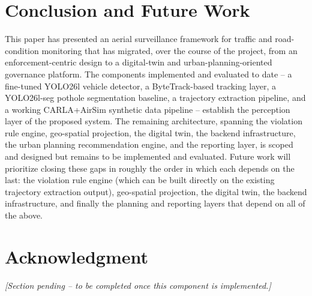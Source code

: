 \documentclass[conference]{IEEEtran}
\newcommand{\pending}{\textit{[Section pending -- to be completed once this component is implemented.]}}
\begin{document}
\section{Conclusion and Future Work}

This paper has presented an aerial surveillance framework for traffic and road-condition monitoring that has migrated, over the course of the project, from an enforcement-centric design to a digital-twin and urban-planning-oriented governance platform. The components implemented and evaluated to date -- a fine-tuned YOLO26l vehicle detector, a ByteTrack-based tracking layer, a YOLO26l-seg pothole segmentation baseline, a trajectory extraction pipeline, and a working CARLA+AirSim synthetic data pipeline -- establish the perception layer of the proposed system. The remaining architecture, spanning the violation rule engine, geo-spatial projection, the digital twin, the backend infrastructure, the urban planning recommendation engine, and the reporting layer, is scoped and designed but remains to be implemented and evaluated. Future work will prioritize closing these gaps in roughly the order in which each depends on the last: the violation rule engine (which can be built directly on the existing trajectory extraction output), geo-spatial projection, the digital twin, the backend infrastructure, and finally the planning and reporting layers that depend on all of the above.

\section*{Acknowledgment}
\pending
\end{document}
